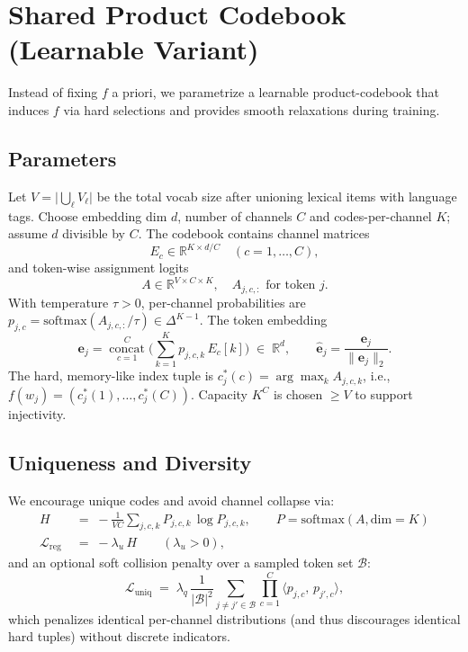 \documentclass[11pt]{article}
\begin{document}
\section{Shared Product Codebook (Learnable Variant)}
Instead of fixing \(f\) a priori, we parametrize a learnable product-codebook that induces \(f\) via hard selections and provides smooth relaxations during training.

\subsection{Parameters}
Let \(V=\lvert \bigcup_{\ell} V_\ell \rvert\) be the total vocab size after unioning lexical items with language tags. Choose embedding dim \(d\), number of channels \(C\) and codes-per-channel \(K\); assume \(d\) divisible by \(C\). The codebook contains channel matrices
\[
  E_c \in \mathbb{R}^{K\times d/C} \quad (c=1,\ldots,C),
\]
and token-wise assignment logits
\[
  A \in \mathbb{R}^{V\times C\times K},\quad A_{j,c,:} \text{ for token } j.
\]
With temperature \(\tau>0\), per-channel probabilities are \(p_{j,c}=\mathrm{softmax}(A_{j,c,:}/\tau)\in\Delta^{K-1}\). The token embedding
\begin{equation}
  \mathbf{e}_j=\operatorname*{concat}_{c=1}^C \Big( \sum_{k=1}^K p_{j,c,k}\, E_c[k] \Big)\;\in\;\mathbb{R}^d, \qquad \hat{\mathbf{e}}_j=\frac{\mathbf{e}_j}{\lVert\mathbf{e}_j\rVert_2}.
\end{equation}
The hard, memory-like index tuple is \(c^{*}_j(c)=\arg\max_k A_{j,c,k}\), i.e.,\ \(f(w_j)=(c^{*}_j(1),\ldots,c^{*}_j(C))\). Capacity \(K^C\) is chosen \(\ge V\) to support injectivity.

\subsection{Uniqueness and Diversity}
We encourage unique codes and avoid channel collapse via:
\begin{align}
  H &\;=\; -\frac{1}{VC}\sum_{j,c,k} P_{j,c,k}\,\log P_{j,c,k},\qquad P=\mathrm{softmax}(A,\text{dim}=K) \label{eq:entropy}\\
  \mathcal{L}_{\text{reg}} &\;=\; -\lambda_{u}\, H\qquad (\lambda_u>0),
\end{align}
and an optional soft collision penalty over a sampled token set \(\mathcal{B}\):
\begin{equation}
  \mathcal{L}_{\text{uniq}}\;=\; \lambda_{q}\, \frac{1}{\lvert\mathcal{B}\rvert^2}\sum_{j\ne j'\in\mathcal{B}} \prod_{c=1}^C \Big\langle p_{j,c},\, p_{j',c}\Big\rangle,\label{eq:uniq}
\end{equation}
which penalizes identical per-channel distributions (and thus discourages identical hard tuples) without discrete indicators.
\end{document}
